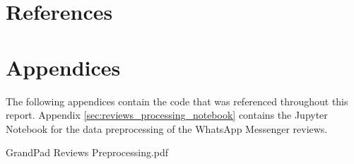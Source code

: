\documentclass[12pt]{article}
\begin{document}
    \setlength\fboxsep{5pt}
    \setlength{\fboxrule}{1pt}
    \restoregeometry

    \markboth{}{}
    {\hypersetup{linkcolor=black}
        \tableofcontents
        \thispagestyle{fancy}
    }
    \markboth{}{}

    \pagebreak

    

    

    \part*{References}
    \begingroup
        \def\section*#1{}
        
        
    \endgroup

    \pagebreak

    \part*{Appendices}
        \begin{appendices}
            The following appendices contain the code that was referenced
                throughout this report.
            Appendix \ref{sec:reviews_processing_notebook} contains the Jupyter
                Notebook for the data preprocessing of the WhatsApp Messenger
                reviews.

            
            {GrandPad Reviews Preprocessing.pdf}
        \end{appendices}
\end{document}
